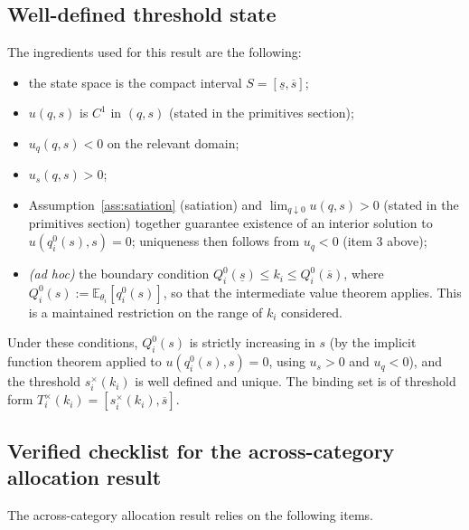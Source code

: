 \documentclass[master.tex]{subfiles}
\begin{document}
\subsection{Well-defined threshold state}

The ingredients used for this result are the following:
\begin{itemize}[leftmargin=2em]
    \item the state space is the compact interval $S=[\underline s,\overline s]$;
    \item $u(q,s)$ is $C^1$ in $(q,s)$ (stated in the primitives section);
    \item $u_q(q,s)<0$ on the relevant domain;
    \item $u_s(q,s)>0$;
    \item Assumption~\ref{ass:satiation} (satiation) and $\lim_{q\downarrow 0}u(q,s)>0$ (stated in the primitives section) together guarantee existence of an interior solution to $u(q_i^0(s),s)=0$; uniqueness then follows from $u_q<0$ (item 3 above);
    \item \textit{(ad hoc)} the boundary condition $Q_i^0(\underline s) \le k_i \le Q_i^0(\overline s)$, where $Q_i^0(s):=\mathbb E_{\theta_i}[q_i^0(s)]$, so that the intermediate value theorem applies. This is a maintained restriction on the range of $k_i$ considered.
\end{itemize}

Under these conditions, $Q_i^0(s)$ is strictly increasing in $s$ (by the implicit function theorem applied to $u(q_i^0(s),s)=0$, using $u_s>0$ and $u_q<0$), and the threshold $s_i^\times(k_i)$ is well defined and unique. The binding set is of threshold form $T_i^\times(k_i)=[s_i^\times(k_i),\overline s]$.

\subsection{Verified checklist for the across-category allocation result}

The across-category allocation result relies on the following items.
\end{document}
